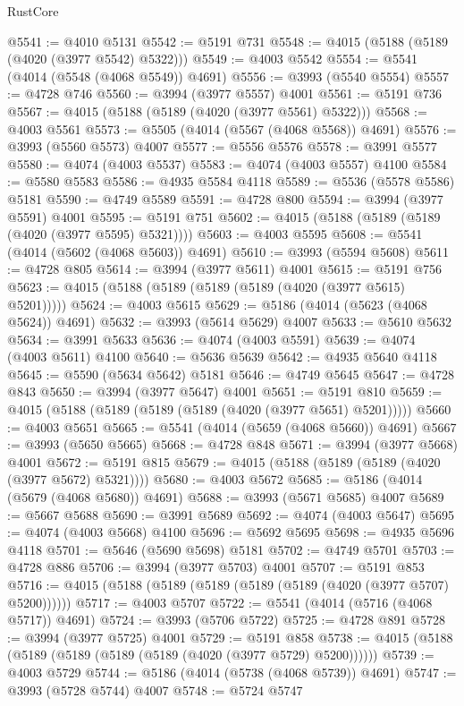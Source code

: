 \begin{lexlean}{RustCore}
\begin{coremodule}
@5541 := @4010 @5131
@5542 := @5191 @731
@5548 := @4015 (@5188 (@5189 (@4020 (@3977 @5542) @5322)))
@5549 := @4003 @5542
@5554 := @5541 (@4014 (@5548 (@4068 @5549)) @4691)
@5556 := @3993 (@5540 @5554)
@5557 := @4728 @746
@5560 := @3994 (@3977 @5557) @4001
@5561 := @5191 @736
@5567 := @4015 (@5188 (@5189 (@4020 (@3977 @5561) @5322)))
@5568 := @4003 @5561
@5573 := @5505 (@4014 (@5567 (@4068 @5568)) @4691)
@5576 := @3993 (@5560 @5573) @4007
@5577 := @5556 @5576
@5578 := @3991 @5577
@5580 := @4074 (@4003 @5537)
@5583 := @4074 (@4003 @5557) @4100
@5584 := @5580 @5583
@5586 := @4935 @5584 @4118
@5589 := @5536 (@5578 @5586) @5181
@5590 := @4749 @5589
@5591 := @4728 @800
@5594 := @3994 (@3977 @5591) @4001
@5595 := @5191 @751
@5602 := @4015 (@5188 (@5189 (@5189 (@4020 (@3977 @5595) @5321))))
@5603 := @4003 @5595
@5608 := @5541 (@4014 (@5602 (@4068 @5603)) @4691)
@5610 := @3993 (@5594 @5608)
@5611 := @4728 @805
@5614 := @3994 (@3977 @5611) @4001
@5615 := @5191 @756
@5623 := @4015 (@5188 (@5189 (@5189 (@5189 (@4020 (@3977 @5615) @5201)))))
@5624 := @4003 @5615
@5629 := @5186 (@4014 (@5623 (@4068 @5624)) @4691)
@5632 := @3993 (@5614 @5629) @4007
@5633 := @5610 @5632
@5634 := @3991 @5633
@5636 := @4074 (@4003 @5591)
@5639 := @4074 (@4003 @5611) @4100
@5640 := @5636 @5639
@5642 := @4935 @5640 @4118
@5645 := @5590 (@5634 @5642) @5181
@5646 := @4749 @5645
@5647 := @4728 @843
@5650 := @3994 (@3977 @5647) @4001
@5651 := @5191 @810
@5659 := @4015 (@5188 (@5189 (@5189 (@5189 (@4020 (@3977 @5651) @5201)))))
@5660 := @4003 @5651
@5665 := @5541 (@4014 (@5659 (@4068 @5660)) @4691)
@5667 := @3993 (@5650 @5665)
@5668 := @4728 @848
@5671 := @3994 (@3977 @5668) @4001
@5672 := @5191 @815
@5679 := @4015 (@5188 (@5189 (@5189 (@4020 (@3977 @5672) @5321))))
@5680 := @4003 @5672
@5685 := @5186 (@4014 (@5679 (@4068 @5680)) @4691)
@5688 := @3993 (@5671 @5685) @4007
@5689 := @5667 @5688
@5690 := @3991 @5689
@5692 := @4074 (@4003 @5647)
@5695 := @4074 (@4003 @5668) @4100
@5696 := @5692 @5695
@5698 := @4935 @5696 @4118
@5701 := @5646 (@5690 @5698) @5181
@5702 := @4749 @5701
@5703 := @4728 @886
@5706 := @3994 (@3977 @5703) @4001
@5707 := @5191 @853
@5716 := @4015 (@5188 (@5189 (@5189 (@5189 (@5189 (@4020 (@3977 @5707) @5200))))))
@5717 := @4003 @5707
@5722 := @5541 (@4014 (@5716 (@4068 @5717)) @4691)
@5724 := @3993 (@5706 @5722)
@5725 := @4728 @891
@5728 := @3994 (@3977 @5725) @4001
@5729 := @5191 @858
@5738 := @4015 (@5188 (@5189 (@5189 (@5189 (@5189 (@4020 (@3977 @5729) @5200))))))
@5739 := @4003 @5729
@5744 := @5186 (@4014 (@5738 (@4068 @5739)) @4691)
@5747 := @3993 (@5728 @5744) @4007
@5748 := @5724 @5747

\end{coremodule}
\end{lexlean}
